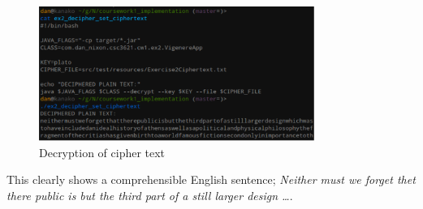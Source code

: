 \documentclass[a4paper]{article}
\begin{document}
\begin{figure}[h!]
  \centering
  \includegraphics[width=0.8\textwidth]{graphics/ex2_plaintext_output.eps}
  \caption{Decryption of cipher text}
  \label{fig:plaintext_output}
\end{figure}

This clearly shows a comprehensible English sentence; \textit{Neither must we
forget thet there public is but the third part of a still larger design \ldots}.
\end{document}
